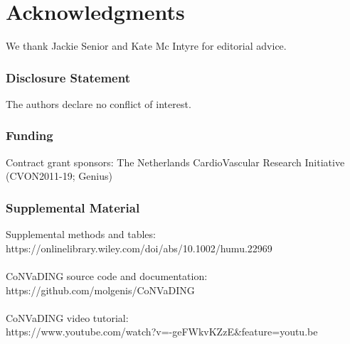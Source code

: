 \section{Acknowledgments}\label{Acknowledgments} 
We thank Jackie Senior and Kate Mc Intyre for editorial advice.


\subsubsection{Disclosure Statement} 
The authors declare no conflict of interest.

\subsubsection{Funding}
Contract grant sponsors: The Netherlands CardioVascular Research Initiative (CVON2011-19; Genius)

\subsubsection{Supplemental Material}
Supplemental methods and tables: \\ https://onlinelibrary.wiley.com/doi/abs/10.1002/humu.22969 \\
\\
CoNVaDING source code and documentation: \\ https://github.com/molgenis/CoNVaDING  \\
\\
CoNVaDING video tutorial: \\ https://www.youtube.com/watch?v=-geFWkvKZzE\&feature=youtu.be